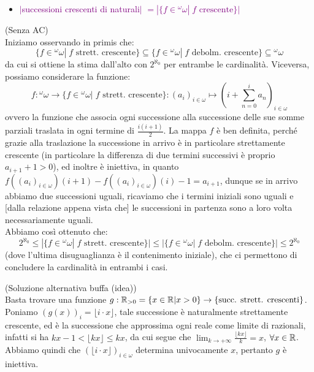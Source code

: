 \begin{itemize}
	\item \textcolor{purple}{$|$successioni crescenti di naturali$|$ $= |\{f \in {}^\omega \omega | \; \text{$f$ crescente}\}|$}
\end{itemize}

\begin{soln}
	(Senza AC)\\
	Iniziamo osservando in primis che:
	\[ \{f \in {}^{\omega}\omega | \; \text{$f$ strett. crescente}\} \subseteq \{f \in {}^{\omega}\omega | \; \text{$f$ debolm. crescente}\} \subseteq {}^{\omega}\omega
		\]
	da cui si ottiene la stima dall'alto con $2^{\aleph_0}$ per entrambe le cardinalità. Viceversa, possiamo considerare la funzione:
	\[ f : {}^{\omega}\omega \to \{f \in {}^{\omega}\omega | \; \text{$f$ strett. crescente}\} : (a_i)_{i \in \omega} \mapsto \left(i + \sum_{n = 0}^i a_n\right)_{i \in \omega}
		\]
	ovvero la funzione che associa ogni successione alla successione delle sue somme parziali traslata in ogni termine di $\frac{i(i+1)}{2}$. La mappa $f$ è ben definita, perché grazie alla traslazione la successione in arrivo è in particolare strettamente
	crescente (in particolare la differenza di due termini successivi è proprio $a_{i+1} + 1 > 0$), ed inoltre è iniettiva, in quanto $f((a_i)_{i \in \omega})(i+1) - f((a_i)_{i \in \omega})(i) - 1 = a_{i+1}$, dunque se in arrivo abbiamo due successioni uguali,
	ricaviamo che i termini iniziali sono uguali e [dalla relazione appena vista che] le successioni in partenza sono a loro volta necessariamente uguali.\\
	Abbiamo così ottenuto che:
	\[ 2^{\aleph_0} \leq |\{f \in {}^{\omega}\omega | \; \text{$f$ strett. crescente}\}| \leq |\{f \in {}^{\omega}\omega | \; \text{$f$ debolm. crescente}\}| \leq 2^{\aleph_0}
		\] 
	(dove l'ultima disuguaglianza è il contenimento iniziale), che ci permettono di concludere la cardinalità in entrambi i casi.
\end{soln}

\begin{soln}
	(Soluzione alternativa buffa (idea))\\
	Basta trovare una funzione $g : \mathbb R_{>0} = \{x \in \mathbb R | x > 0\} \to \{\text{succ. strett. crescenti}\}$. Poniamo $(g(x))_{i} = \lfloor i \cdot x\rfloor$, tale successione è naturalmente strettamente crescente, ed è la successione che approssima ogni reale come limite di razionali,
	infatti si ha $kx - 1 < \lfloor kx \rfloor \leq kx$, da cui segue che $\lim_{k \to +\infty} \frac{\lfloor kx \rfloor}{k} = x$, $\forall x \in \mathbb R$. Abbiamo quindi che $(\lfloor i \cdot x \rfloor)_{i \in \omega}$ determina univocamente $x$, pertanto $g$ è iniettiva.
\end{soln}


